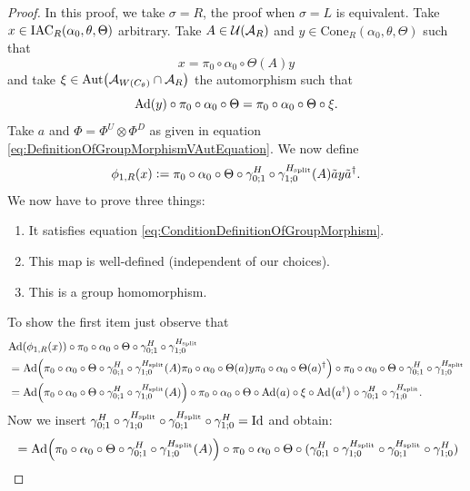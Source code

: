 \documentclass[11pt,a4paper,twoside]{article}
\numberwithin{equation}{section}
\begin{document}
	\begin{proof}
		In this proof, we take $\sigma=R$, the proof when $\sigma=L$ is equivalent. Take $x\in \textrm{IAC}_R(\alpha_0,\theta,\Theta)$ arbitrary. Take $A\in\mathcal U(\mathcal A_R)$ and $y\in\textrm{Cone}_R(\alpha_0,\theta,\Theta)$ such that
		\begin{equation}
			x=\pi_0\circ\alpha_0\circ\Theta(A)y
		\end{equation}
		and take $\xi\in\Aut{\AA_{W(C_\theta)}\cap \AA_R}$ the automorphism such that
		\begin{equation}
			\Ad{y}\circ\pi_0\circ\alpha_0\circ\Theta=\pi_0\circ\alpha_0\circ\Theta\circ\xi.
		\end{equation}
		Take $a$ and $\Phi=\Phi^U\otimes\Phi^D$ as given in equation \eqref{eq:DefinitionOfGroupMorphismVAutEquation}. We now define
		\begin{equation}
			\phi_{1,R}(x)\vcentcolon= \pi_0\circ\alpha_0\circ\Theta\circ\gamma^H_{0;1}\circ\gamma^{{H_{\text{split}}}}_{1;0}(A)\tilde{a}y\tilde{a}^\dagger.
		\end{equation}
		We now have to prove three things:
		\begin{enumerate}
			\item It satisfies equation \eqref{eq:ConditionDefinitionOfGroupMorphism}.
			\item This map is well-defined (independent of our choices).
			\item This is a group homomorphism.
		\end{enumerate}
		To show the first item just observe that
		\begin{align}
			&\Ad{\phi_{1,R}(x)}\circ\pi_0\circ\alpha_0\circ\Theta\circ\gamma^H_{0;1}\circ\gamma^{\Hsplit}_{1;0}\\
			&=\Ad{\pi_0\circ\alpha_0\circ\Theta\circ\gamma^H_{0;1}\circ\gamma^{\Hsplit}_{1;0}(A)\pi_0\circ\alpha_0\circ\Theta(a)y\pi_0\circ\alpha_0\circ\Theta(a)^\dagger}\circ\pi_0\circ\alpha_0\circ\Theta\circ\gamma^H_{0;1}\circ\gamma^{\Hsplit}_{1;0}\\
			&=\Ad{\pi_0\circ\alpha_0\circ\Theta\circ\gamma^H_{0;1}\circ\gamma^{\Hsplit}_{1;0}(A)}\circ\pi_0\circ\alpha_0\circ\Theta\circ\Ad{a}\circ\xi\circ\Ad{a^\dagger}\circ\gamma^H_{0;1}\circ\gamma^{\Hsplit}_{1;0}.
		\end{align}
		Now we insert $\gamma^H_{0;1}\circ\gamma^{{H_{\text{split}}}}_{1;0}\circ\gamma^{{H_{\text{split}}}}_{0;1}\circ\gamma^H_{1;0}=\text{Id}$ and obtain:
		\begin{align}
			&=\Ad{\pi_0\circ\alpha_0\circ\Theta\circ\gamma^H_{0;1}\circ\gamma^{\Hsplit}_{1;0}(A)}\circ\pi_0\circ\alpha_0\circ\Theta\circ(\gamma^H_{0;1}\circ\gamma^{\Hsplit}_{1;0}\circ\gamma^{\Hsplit}_{0;1}\circ\gamma^H_{1;0})\\

\end{align}
\end{proof}
\end{document}
